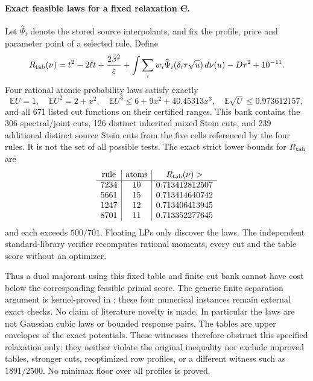 \paragraph{Exact feasible laws for a fixed relaxation \st{C}.}
Let $\widehat\Psi_i$ denote the stored source interpolants, and fix the
profile, price and parameter point of a selected rule. Define
\[
 R_{\rm tab}(\nu)=t^2-2\bar\ell t+\frac{2\bar\beta^2}{\varepsilon}
 +\int\sum_iw_i\widehat\Psi_i(\delta_i\tau\sqrt u)\,d\nu(u)
 -D\tau^2+10^{-11}.
\]
Four rational atomic probability laws satisfy exactly
\[
 \mathbb EU=1,\quad \mathbb EU^2=2+x^2,\quad
 \mathbb EU^3\le6+9x^2+40.45313x^3,\quad
 \mathbb E\sqrt U\le0.973612157,
\]
and all 671 listed cut functions on their certified ranges. This bank
contains the 306 spectral/joint cuts, 126 distinct inherited mixed Stein
cuts, and 239 additional distinct source Stein cuts from the five cells
referenced by the four rules. It is not the set of all possible tests.
The exact strict lower bounds for $R_{\rm tab}$ are
\[
\begin{array}{c|c|c}
 \text{rule}&\text{atoms}&R_{\rm tab}(\nu)>\\\hline
 7234&10&0.713412812507\\
 5661&15&0.713414640742\\
 1247&12&0.713406413945\\
 8701&11&0.713352277645
\end{array}
\]
and each exceeds $500/701$. Floating LPs only discover the laws.
The independent standard-library verifier recomputes rational moments,
every cut and the table score without an optimizer.

Thus a dual majorant using this fixed table and finite cut bank cannot
have cost below the corresponding feasible primal score. The generic
finite separation argument is kernel-proved in
; these four numerical instances remain
external exact checks. No claim of literature novelty is made.
In particular the laws are not Gaussian cubic laws or bounded response
pairs. The tables are upper envelopes of the exact potentials.
These witnesses therefore obstruct this specified relaxation only;
they neither violate the original inequality nor exclude improved
tables, stronger cuts, reoptimized row profiles, or a different witness
such as $1891/2500$. No minimax floor over all profiles is proved.

